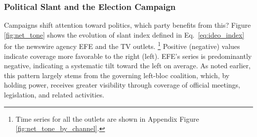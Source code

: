 \documentclass[12pt]{article}
\begin{document}
	
	

	

 
	

	

	
		\FloatBarrier
	

\subsubsection*{Political Slant and the Election Campaign}


Campaigns shift attention toward politics, which party benefits from this?   Figure \ref{fig:net_tone} shows the  evolution of slant index defined in Eq.~\eqref{eq:ideo_index}  for the newswire agency EFE and  the TV outlets. \footnote{Time series for all the outlets are shown in Appendix Figure \ref{fig:net_tone_by_channel}.} Positive (negative) values indicate coverage more favorable to the right (left).  EFE’s series is predominantly negative, indicating a systematic tilt toward the left on average. As noted earlier, this pattern largely stems from the governing left-bloc coalition, which, by holding power, receives greater visibility through coverage of official meetings, legislation, and related activities.
\end{document}
